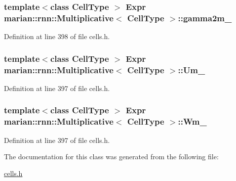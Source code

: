 \subsubsection[{\texorpdfstring{gamma2m\+\_\+}{gamma2m_}}]{\setlength{\rightskip}{0pt plus 5cm}template$<$class Cell\+Type $>$ {\bf Expr} {\bf marian\+::rnn\+::\+Multiplicative}$<$ Cell\+Type $>$\+::gamma2m\+\_\+\hspace{0.3cm}{\ttfamily [protected]}}\hypertarget{classmarian_1_1rnn_1_1Multiplicative_a1984a6776106c31887279d6c60e3874c}{}\label{classmarian_1_1rnn_1_1Multiplicative_a1984a6776106c31887279d6c60e3874c}


Definition at line 398 of file cells.\+h.

\subsubsection[{\texorpdfstring{Um\+\_\+}{Um_}}]{\setlength{\rightskip}{0pt plus 5cm}template$<$class Cell\+Type $>$ {\bf Expr} {\bf marian\+::rnn\+::\+Multiplicative}$<$ Cell\+Type $>$\+::Um\+\_\+\hspace{0.3cm}{\ttfamily [protected]}}\hypertarget{classmarian_1_1rnn_1_1Multiplicative_a5048c83eb0045b7a85304e3557727e07}{}\label{classmarian_1_1rnn_1_1Multiplicative_a5048c83eb0045b7a85304e3557727e07}


Definition at line 397 of file cells.\+h.

\subsubsection[{\texorpdfstring{Wm\+\_\+}{Wm_}}]{\setlength{\rightskip}{0pt plus 5cm}template$<$class Cell\+Type $>$ {\bf Expr} {\bf marian\+::rnn\+::\+Multiplicative}$<$ Cell\+Type $>$\+::Wm\+\_\+\hspace{0.3cm}{\ttfamily [protected]}}\hypertarget{classmarian_1_1rnn_1_1Multiplicative_acea0bc134660ffa076fad2536207fedb}{}\label{classmarian_1_1rnn_1_1Multiplicative_acea0bc134660ffa076fad2536207fedb}


Definition at line 397 of file cells.\+h.



The documentation for this class was generated from the following file\+:\begin{DoxyCompactItemize}
\item 
\hyperlink{cells_8h}{cells.\+h}\end{DoxyCompactItemize}
